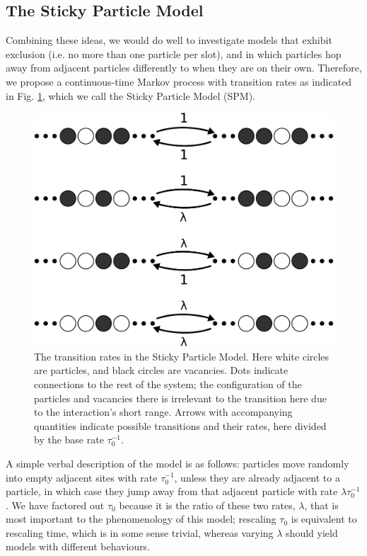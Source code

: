 \subsection{The Sticky Particle Model}
Combining these ideas, we would do well to investigate models that exhibit exclusion (i.e. no more than one 
particle per slot), and in which particles hop away from adjacent particles 
differently to when they are on their 
own. Therefore, we propose a continuous-time Markov process with transition rates as indicated in
Fig. \ref{fig:transRates}, which we call the Sticky Particle Model (SPM).
\begin{figure} \caption[The transition rates in the Sticky Particle Model.]{The transition rates in the Sticky Particle Model. Here white circles are particles, and black circles are vacancies. Dots indicate connections to the rest of 
the system; the configuration of the particles and vacancies there is irrelevant to the transition here due to the
interaction's short range. Arrows with accompanying quantities indicate possible transitions and their rates, here 
divided by the base rate $\tau_0^{-1}$.} 
\label{fig:transRates}
\begin{center}
\includegraphics[width=1.0\textwidth]{intro/images/ratesDB}
\end{center}
\end{figure}
A simple verbal description of the model is as follows: particles move randomly into empty adjacent sites with rate 
$\tau_0^{-1}$, unless they are already adjacent to a particle, in which case they jump away from that adjacent
particle with rate $\lambda \tau_0^{-1}$. We have factored out $\tau_0$ because it is the ratio of these two rates,
$\lambda$, that is most important to the phenomenology of this model; rescaling $\tau_0$ is equivalent to 
rescaling time, which is in some sense trivial, whereas varying $\lambda$ should yield models with different behaviours.

